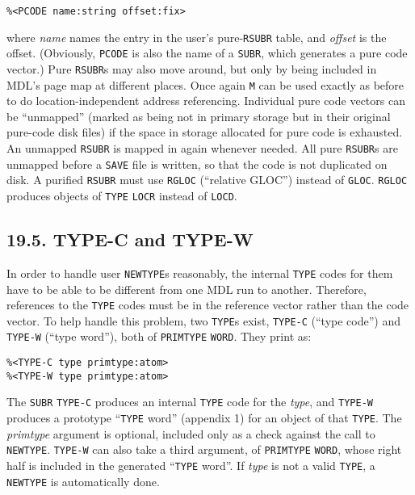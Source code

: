\documentclass[a4paper,]{article}
\begin{document}
\begin{verbatim}
%<PCODE name:string offset:fix>
\end{verbatim}

where \emph{name} names the entry in the user's pure-\texttt{RSUBR} table, and \emph{offset} is the offset. (Obviously,
\texttt{PCODE} is also the name of a \texttt{SUBR}, which generates a pure code vector.) Pure \texttt{RSUBR}s may also move
around, but only by being included in MDL's page map at different places. Once again \texttt{M} can be used exactly as
before to do location-independent address referencing. Individual pure code vectors can be ``unmapped'' (marked as being
not in primary storage but in their original pure-code disk files) if the space in storage allocated for pure code is
exhausted. An unmapped \texttt{RSUBR} is mapped in again whenever needed. All pure \texttt{RSUBR}s are unmapped before a
\texttt{SAVE} file is written, so that the code is not duplicated on disk. A purified \texttt{RSUBR}
must use \texttt{RGLOC} (``relative GLOC'') instead of \texttt{GLOC}.
\texttt{RGLOC} produces objects of \texttt{TYPE} \texttt{LOCR} instead of \texttt{LOCD}.

\subsection{19.5. TYPE-C and TYPE-W}\label{type-c-and-type-w}

In order to handle user \texttt{NEWTYPE}s reasonably, the internal \texttt{TYPE} codes for them
have to be able to be different from one MDL run to another. Therefore, references to the \texttt{TYPE} codes must be in
the reference vector rather than the code vector. To help handle this problem, two \texttt{TYPE}s exist,
\texttt{TYPE-C} (``type code'') and \texttt{TYPE-W} (``type
word''), both of \texttt{PRIMTYPE} \texttt{WORD}. They print as:

\begin{verbatim}
%<TYPE-C type primtype:atom>
%<TYPE-W type primtype:atom>
\end{verbatim}

The \texttt{SUBR} \texttt{TYPE-C} produces an internal \texttt{TYPE} code for the \emph{type}, and \texttt{TYPE-W} produces
a prototype ``\texttt{TYPE} word'' (appendix 1) for an object of that \texttt{TYPE}. The \emph{primtype} argument is
optional, included only as a check against the call to \texttt{NEWTYPE}. \texttt{TYPE-W} can also take a third argument, of
\texttt{PRIMTYPE} \texttt{WORD}, whose right half is included in the generated ``\texttt{TYPE} word''. If \emph{type} is
not a valid \texttt{TYPE}, a \texttt{NEWTYPE} is automatically done.
\end{document}

